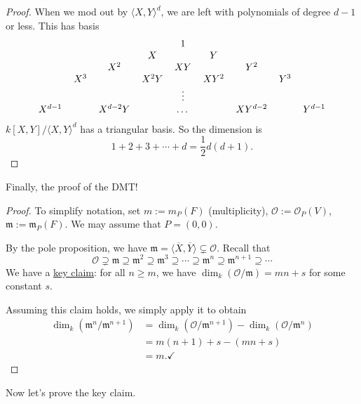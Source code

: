 \documentclass[12pt]{article}
\newcommand{\vbrack}[1]{\langle #1\rangle}
\theoremstyle{definition}
\begin{document}
\begin{proof}
    When we mod out by $\vbrack{X,Y}^d$, we are left with polynomials of degree $d-1$ or less. This has basis
    \[\begin{tabular}{ c c c c c c c c c }
    \empty & \empty & \empty & \empty & $1$ & \empty & \empty & \empty & \empty \\
    \empty & \empty & \empty & $X$ & \empty & $Y$ & \empty & \empty & \empty \\
    \empty & \empty & $X^2$ & \empty & $XY$ & \empty & $Y^2$ & \empty & \empty \\
    \empty & $X^3$ & \empty & $X^2Y$ & \empty & $XY^2$ & \empty & $Y^3$ & \empty \\
    \empty & \empty & \empty & \empty & $\vdots$ & \empty & \empty & \empty & \empty \\
    $X^{d-1}$ & \empty & $X^{d-2}Y$ & \empty & $\dots$ & \empty & $XY^{d-2}$ & \empty & $Y^{d-1}$
    \end{tabular}\]
    $k[X,Y]/\vbrack{X,Y}^d$ has a triangular basis. So the dimension is 
    \[1+2+3+\dotsb+d=\frac{1}{2}d(d+1).\]
\end{proof}
Finally, the proof of the DMT!
\begin{proof}
    To simplify notation, set $m:=m_P(F)$ (multiplicity), $\mathcal{O}:=\mathcal{O}_P(V)$, $\mathfrak{m}:=\mathfrak{m}_P(F)$. We may assume that $P=(0,0)$.
    
    By the pole proposition, we have $\mathfrak{m}=\vbrack{\overline{X},\overline{Y}}\subsetneq\mathcal{O}$. Recall that
    \[\mathcal{O}\supsetneq\mathfrak{m}\supseteq\mathfrak{m}^2\supseteq\mathfrak{m}^3\supseteq\dotsb\supseteq\mathfrak{m}^n\supseteq\mathfrak{m}^{n+1}\supseteq\dotsb\]
    We have a \underline{key claim}: for all $n\geq m$, we have $\dim_k(\mathcal{O}/\mathfrak{m})=mn+s$ for some constant $s$.
    
    Assuming this claim holds, we simply apply it to obtain
    \begin{align*}
        \dim_k(\mathfrak{m}^n/\mathfrak{m}^{n+1})&=\dim_k(\mathcal{O}/\mathfrak{m}^{n+1})-\dim_k(\mathcal{O}/\mathfrak{m}^n)\\
        &=m(n+1)+s-(mn+s)\\
        &=m. \checkmark
    \end{align*}
\end{proof}
Now let's prove the key claim.
\end{document}
